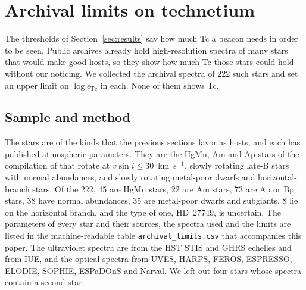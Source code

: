 \documentclass[final,5p]{elsarticle}
\begin{document}
\section{Archival limits on technetium}
\label{sec:archival}

The thresholds of Section~\ref{sec:results} say how much Tc a beacon needs in order to be seen. Public archives already hold high-resolution spectra of many stars that would make good hosts, so they show how much Tc those stars could hold without our noticing. We collected the archival spectra of 222 such stars and set an upper limit on $\log\epsilon_\mathrm{Tc}$ in each. None of them shows Tc.

\subsection{Sample and method}
\label{sec:archival_method}

The stars are of the kinds that the previous sections favor as hosts, and each has published atmospheric parameters. They are the HgMn, Am and Ap stars of the compilation of \citet{Ghazaryan2018} that rotate at $v\sin i \leq 30$~km~s$^{-1}$, slowly rotating late-B stars with normal abundances, and slowly rotating metal-poor dwarfs and horizontal-branch stars. Of the 222, 45 are HgMn stars, 22 are Am stars, 73 are Ap or Bp stars, 38 have normal abundances, 35 are metal-poor dwarfs and subgiants, 8 lie on the horizontal branch, and the type of one, HD~27749, is uncertain. The parameters of every star and their sources, the spectra used and the limits are listed in the machine-readable table \texttt{archival\_limits.csv} that accompanies this paper. The ultraviolet spectra are from the HST STIS and GHRS echelles and from IUE, and the optical spectra from UVES, HARPS, FEROS, ESPRESSO, ELODIE, SOPHIE, ESPaDOnS and Narval. We left out four stars whose spectra contain a second star.
\end{document}
